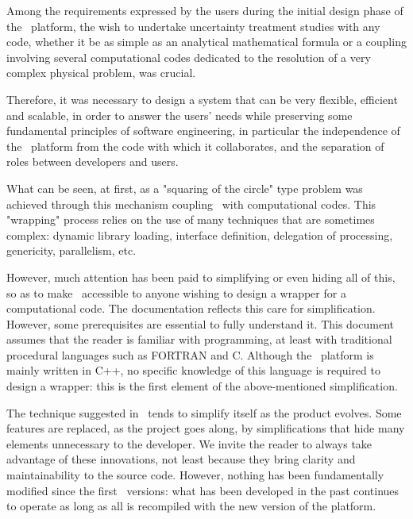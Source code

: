 
Among the requirements expressed by the users during the initial design phase of the \OT\ platform, the wish to undertake uncertainty treatment studies with any code, whether it be as simple as an analytical mathematical formula or a coupling involving several computational codes dedicated to the resolution of a very complex physical problem, was crucial.

Therefore, it was necessary to design a system that can be very flexible, efficient and scalable, in order to answer the users' needs while preserving some fundamental principles of software engineering, in particular the independence of the \OT\ platform from the code with which it collaborates, and the separation of roles between developers and users.

What can be seen, at first, as a "squaring of the circle" type problem was achieved through this mechanism coupling \OT\ with computational codes. This "wrapping" process relies on the use of many techniques that are sometimes complex: dynamic library loading, interface definition, delegation of processing, genericity, parallelism, etc.

However, much attention has been paid to simplifying or even hiding all of this, so as to make \OT\ accessible to anyone wishing to design a wrapper for a computational code. The documentation reflects this care for simplification. However, some prerequisites are essential to fully understand it. This document assumes that the reader is familiar with programming, at least with traditional procedural languages such as FORTRAN and C. Although the \OT\ platform is mainly written in C++, no specific knowledge of this language is required to design a wrapper: this is the first element of the above-mentioned simplification.

The technique suggested in \OT\ tends to simplify itself as the product evolves. Some features are replaced, as the project goes along, by simplifications that hide many elements unnecessary to the developer. We invite the reader to always take advantage of these innovations, not least because they bring clarity and maintainability to the source code. However, nothing has been fundamentally modified since the first \OT\ versions: what has been developed in the past continues to operate as long as all is recompiled with the new version of the platform.